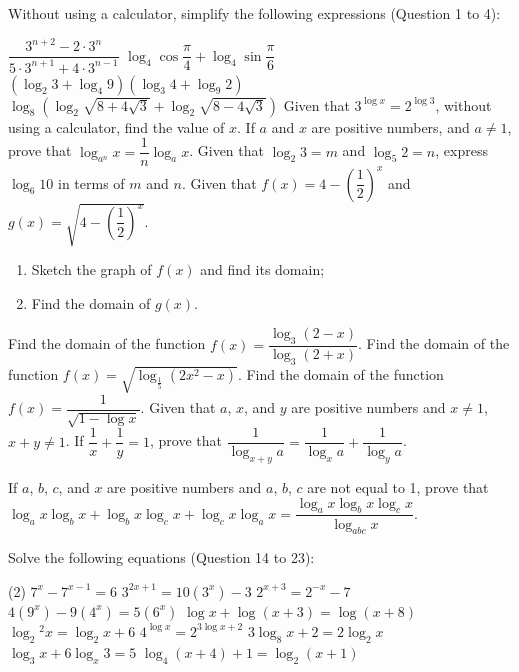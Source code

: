 \documentclass{report}
\begin{document}
        Without using a calculator, simplify the following expressions (Question 1 to 4):
        \begin{tasks}[label=\arabic*.]
                \task $\dfrac{3^{n+2}-2 \cdot 3^n}{5 \cdot 3^{n+1}+4 \cdot 3^{n-1}}$
                \task $\log _4 \cos \dfrac{\pi}{4}+\log _4 \sin \dfrac{\pi}{6}$
                \task $\left(\log _2 3+\log _4 9\right)\left(\log _3 4+\log _9 2\right)$
                \task $\log _8\left(\log _2 \sqrt{8+4 \sqrt{3}}+\log _2 \sqrt{8-4 \sqrt{3}}\right)$
                \task Given that $3^{\log x}=2^{\log 3}$, without using a calculator, find the value of $x$.
                \task If $a$ and $x$ are positive numbers, and $a \neq 1$, prove that $\log _{a^n} x=\dfrac{1}{n} \log _a x$.
                \task Given that $
                \log _2 3=m$ and $\log _5 2=n$, express $\log _6 10$ in terms of $m$ and $n$.
                \task Given that $f(x)=4-\left(\dfrac{1}{2}\right)^x$ and $g(x)=\sqrt{4-\left(\dfrac{1}{2}\right)^x}$.
                \begin{enumerate}[label=(\alph*)]
                    \item Sketch the graph of $f(x)$ and find its domain;
                    \item Find the domain of $g(x)$.
                \end{enumerate}
                \task Find the domain of the function $f(x)=\dfrac{\log _3(2-x)}{\log _3(2+x)}$.
                \task Find the domain of the function $f(x)=\sqrt{\log _{\frac{1}{5}}\left(2 x^2-x\right)}$.
                \task Find the domain of the function $f(x)=\dfrac{1}{\sqrt{1-\log x}}$.
                \task Given that $a$, $x$, and $y$ are positive numbers and $x \neq 1$, $x+y \neq 1$. If $\dfrac{1}{x}+\dfrac{1}{y}=1$, prove that $\dfrac{1}{\log _{x+y} a}=\dfrac{1}{\log _x a}+\dfrac{1}{\log _y a}$.

                \task If $a$, $b$, $c$, and $x$ are positive numbers and $a$, $b$, $c$ are not equal to 1, prove that $\log _a x \log _b x+\log _b x \log _c x+\log _c x \log _a x=\dfrac{\log _a x \log _b x \log _c x}{\log _{a b c} x}$.
        \end{tasks}

        \noindent Solve the following equations (Question 14 to 23):
        \begin{tasks}[label=\arabic*.,resume](2)
            \task $7^x-7^{x-1}=6$
            \task $3^{2 x+1}=10\left(3^x\right)-3$
            \task $2^{x+3}=2^{-x}-7$
            \task $4\left(9^x\right)-9\left(4^x\right)=5\left(6^x\right)$
            \task $\log x+\log (x+3)=\log (x+8)$
            \task $\log _2{ }^2 x=\log _2 x+6$
            \task $4^{\log x}=2^{3 \log x+2}$
            \task $3 \log _8 x+2=2 \log _2 x$
            \task $\log _3 x+6 \log _x 3=5$
            \task $\log _4(x+4)+1=\log _2(x+1)$
        \end{tasks}
\end{document}
